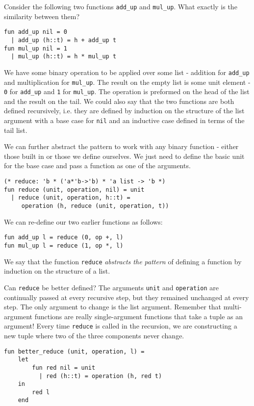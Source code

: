 \documentclass[11pt]{article}
\begin{document}
Consider the following two functions \verb~add_up~ and \verb~mul_up~. What exactly is the similarity between them?

\begin{verbatim}
fun add_up nil = 0
  | add_up (h::t) = h + add_up t
fun mul_up nil = 1
  | mul_up (h::t) = h * mul_up t
\end{verbatim}

We have some binary operation to be applied over some list - addition for \verb~add_up~ and multiplication for \verb~mul_up~. The result on the empty list is some unit element - \verb~0~ for \verb~add_up~ and \verb~1~ for \verb~mul_up~. The operation is preformed on the head of the list and the result on the tail. We could also say that the two functions are both defined recursively, i.e. they are defined by induction on the structure of the list argument with a base case for \verb~nil~ and an inductive case defined in terms of the tail list.

We can further abstract the pattern to work with any binary function - either those built in or those we define ourselves. We just need to define the basic unit for the base case and pass a function as one of the arguments.

\begin{verbatim}
(* reduce: 'b * ('a*'b->'b) * 'a list -> 'b *)
fun reduce (unit, operation, nil) = unit
  | reduce (unit, operation, h::t) = 
     operation (h, reduce (unit, operation, t))
\end{verbatim}

We can re-define our two earlier functions as follows:

\begin{verbatim}
fun add_up l = reduce (0, op +, l)
fun mul_up l = reduce (1, op *, l)
\end{verbatim}

We say that the function \verb~reduce~ \emph{abstracts the pattern} of defining a function by induction on the structure of a list.

Can \verb~reduce~ be better defined? The arguments \verb~unit~ and \verb~operation~ are continually passed at every recursive step, but they remained unchanged at every step. The only argument to change is the list argument. Remember that multi-argument functions are really single-argument functions that take a tuple as an argument! Every time \verb~reduce~ is called in the recursion, we are constructing a new tuple where two of the three components never change. 

\begin{verbatim}
fun better_reduce (unit, operation, l) = 
    let
        fun red nil = unit
          | red (h::t) = operation (h, red t)
    in
        red l
    end
\end{verbatim}
\end{document}
